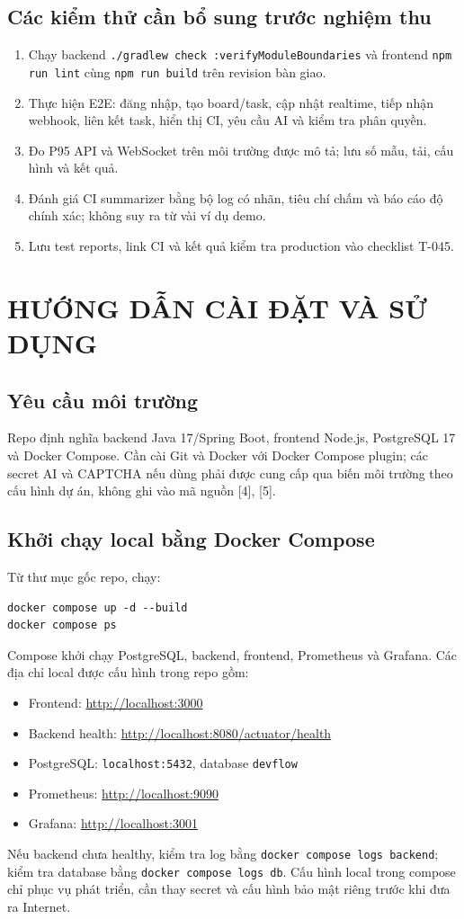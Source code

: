 \documentclass[12pt,a4paper]{report}
\begin{document}
\section{Các kiểm thử cần bổ sung trước nghiệm thu}
\begin{enumerate}
    \item Chạy backend \texttt{./gradlew check :verifyModuleBoundaries} và frontend \texttt{npm run lint} cùng \texttt{npm run build} trên revision bàn giao.
    \item Thực hiện E2E: đăng nhập, tạo board/task, cập nhật realtime, tiếp nhận webhook, liên kết task, hiển thị CI, yêu cầu AI và kiểm tra phân quyền.
    \item Đo P95 API và WebSocket trên môi trường được mô tả; lưu số mẫu, tải, cấu hình và kết quả.
    \item Đánh giá CI summarizer bằng bộ log có nhãn, tiêu chí chấm và báo cáo độ chính xác; không suy ra từ vài ví dụ demo.
    \item Lưu test reports, link CI và kết quả kiểm tra production vào checklist T-045.
\end{enumerate}

\chapter{HƯỚNG DẪN CÀI ĐẶT VÀ SỬ DỤNG}
\section{Yêu cầu môi trường}
Repo định nghĩa backend Java 17/Spring Boot, frontend Node.js, PostgreSQL 17 và Docker Compose. Cần cài Git và Docker với Docker Compose plugin; các secret AI và CAPTCHA nếu dùng phải được cung cấp qua biến môi trường theo cấu hình dự án, không ghi vào mã nguồn [4], [5].

\section{Khởi chạy local bằng Docker Compose}
Từ thư mục gốc repo, chạy:
\begin{verbatim}
docker compose up -d --build
docker compose ps
\end{verbatim}
Compose khởi chạy PostgreSQL, backend, frontend, Prometheus và Grafana. Các địa chỉ local được cấu hình trong repo gồm:
\begin{itemize}
    \item Frontend: \url{http://localhost:3000}
    \item Backend health: \url{http://localhost:8080/actuator/health}
    \item PostgreSQL: \texttt{localhost:5432}, database \texttt{devflow}
    \item Prometheus: \url{http://localhost:9090}
    \item Grafana: \url{http://localhost:3001}
\end{itemize}
Nếu backend chưa healthy, kiểm tra log bằng \texttt{docker compose logs backend}; kiểm tra database bằng \texttt{docker compose logs db}. Cấu hình local trong compose chỉ phục vụ phát triển, cần thay secret và cấu hình bảo mật riêng trước khi đưa ra Internet.
\end{document}
